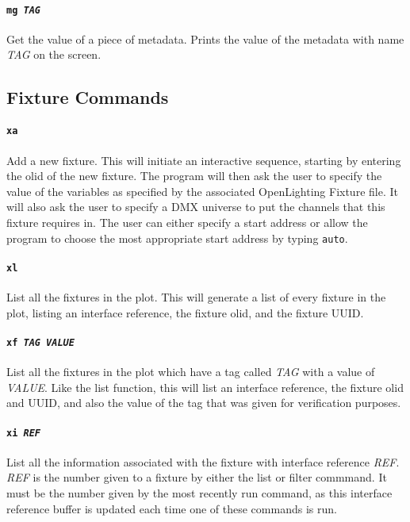 \documentclass[a4paper]{article}
\begin{document}
\paragraph{\texttt{mg \textit{TAG}}}
Get the value of a piece of metadata. Prints the value of the metadata with
name \textit{TAG} on the screen.

\subsection{Fixture Commands}

\paragraph{\texttt{xa}}
Add a new fixture. This will initiate an interactive sequence, starting by 
entering the olid of the new fixture. The program will then ask the user to 
specify the value of the variables as specified by the associated 
OpenLighting Fixture file. It will also ask the user to specify a DMX universe 
to put the channels that this fixture requires in. The user can either 
specify a start address or allow the program to choose the most appropriate 
start address by typing \texttt{auto}.

\paragraph{\texttt{xl}}
List all the fixtures in the plot. This will generate a list of every fixture 
in the plot, listing an interface reference, the fixture olid, and the fixture 
UUID.

\paragraph{\texttt{xf \textit{TAG VALUE}}}
List all the fixtures in the plot which have a tag called \textit{TAG} with a 
value of \textit{VALUE}. Like the list function, this will list an interface 
reference, the fixture olid and UUID, and also the value of the tag that was 
given for verification purposes.

\paragraph{\texttt{xi \textit{REF}}}
List all the information associated with the fixture with interface reference 
\textit{REF}. \textit{REF} is the number given to a fixture by either the 
list or filter commmand. It must be the number given by the most recently run 
command, as this interface reference buffer is updated each time one of these 
commands is run.
\end{document}
